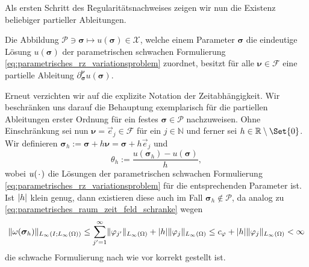 Als ersten Schritt des Regularitätsnachweises zeigen wir nun die Existenz beliebiger partieller Ableitungen.

\begin{Satz}
\label{satz:existenz_partieller_ableitungen}
    Die Abbildung $\mathcal P \ni \bm\sigma \mapsto u(\bm\sigma) \in \mathcal X$, welche einem Parameter $\bm\sigma$ die eindeutige Lösung $u(\bm\sigma)$ der parametrischen schwachen Formulierung \cref{eq:parametrisches_rz_variationsproblem} zuordnet, besitzt für alle $\bm\nu \in \mathcal F$ eine partielle Ableitung $\partial^{\bm\nu}_{\bm\sigma} u(\bm\sigma)$.

    \begin{Beweis}
        Erneut verzichten wir auf die explizite Notation der Zeitabhängigkeit.
        Wir beschränken uns darauf die Behauptung exemplarisch für die partiellen Ableitungen erster Ordnung für ein festes $\bm\sigma \in \mathcal P$ nachzuweisen.
        Ohne Einschränkung sei nun $\bm\nu = \vec{e}_{j} \in \mathcal F$ für ein $j \in \mathbb{N}$ und ferner sei $h \in \mathbb{R} \setminus \Set{ 0 }$.
        Wir definieren $\bm\sigma_{h} := \bm\sigma + h \bm\nu = \bm\sigma + h \vec e_{j}$ und
        \begin{equation}
            \theta_{h} := \frac{u(\bm\sigma_{h}) - u(\bm\sigma)}{h},
        \end{equation}
        wobei $u({\mkern2mu\cdot\mkern2mu})$ die Lösungen der parametrischen schwachen Formulierung \cref{eq:parametrisches_rz_variationsproblem} für die entsprechenden Parameter ist.
        Ist $\lvert h\rvert$ klein genug, dann existieren diese auch im Fall $\bm\sigma_{h} \not\in \mathcal P$, da analog zu \cref{eq:parametrisches_raum_zeit_feld_schranke} wegen
        \begin{equation}
            \lVert\omega(\bm \sigma_{h})\rVert_{L_{\infty}(I; L_{\infty}(\Omega))} \leq \sum_{j' = 1}^{\infty} \lVert\varphi_{j'}\rVert_{L_{\infty}(\Omega)} + \lvert h\rvert \lVert\varphi_{j}\rVert_{L_{\infty}(\Omega)}\leq c_{\varphi} + \lvert h\rvert \lVert\varphi_{j}\rVert_{L_{\infty}(\Omega)} < \infty
        \end{equation}
        die schwache Formulierung nach wie vor korrekt gestellt ist.


\end{Beweis}
\end{Satz}
